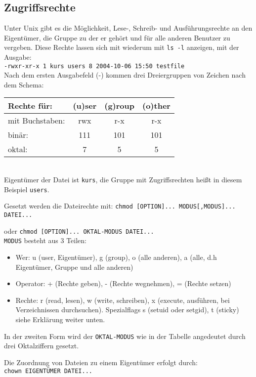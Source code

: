 \documentclass[11pt]{article}
\begin{document}
\subsection{Zugriffsrechte}
Unter Unix gibt es die Möglichkeit, Lese-, Schreib- und
Ausführungsrechte an den Eigentümer, die Gruppe zu der er gehört und
für alle anderen Benutzer zu vergeben. Diese Rechte lassen sich mit
wiederum mit \texttt{ls -l} anzeigen, mit der Ausgabe: \\

\texttt{-rwxr-xr-x    1 kurs     users           8 2004-10-06 15:50 testfile } \\

Nach dem ersten Ausgabefeld (-) kommen drei Dreiergruppen von Zeichen
nach dem Schema:

\begin{tabular}{|l|c|c|c|}
\hline
Rechte für: & (u)ser & (g)roup & (o)ther \\
\hline
\hline
mit Buchstaben: & rwx & r-x & r-x \\ 
binär: & 111 & 101 & 101  \\
oktal: & 7 & 5 & 5 \\
\hline
\end{tabular}\\

Eigentümer der Datei ist \texttt{kurs}, die Gruppe mit Zugriffsrechten
heißt in diesem Beispiel \texttt{users}.

Gesetzt werden die Dateirechte mit:
\texttt{chmod [OPTION]... MODUS[,MODUS]... DATEI...}

oder \texttt{chmod [OPTION]... OKTAL-MODUS DATEI...}\\

\texttt{MODUS} besteht aus 3 Teilen:
\begin{itemize}
\item Wer: u (user, Eigentümer), g (group), o (alle anderen), a (alle,
  d.h Eigentümer, Gruppe und alle anderen)
\item Operator: + (Rechte geben), - (Rechte wegnehmen), = (Rechte
  setzen)
\item Rechte: r (read, lesen), w (write, schreiben), x (execute,
  ausführen, bei Verzeichnissen durchsuchen). Spezialflags s (setuid oder setgid), t (sticky) siehe Erklärung weiter unten.
\end{itemize}

In der zweiten Form wird der \texttt{OKTAL-MODUS} wie in der Tabelle
angedeutet durch drei Oktalziffern gesetzt. 

Die Zuordnung von Dateien zu einem Eigentümer erfolgt durch: \\
\texttt{chown EIGENTÜMER DATEI...}
\end{document}
